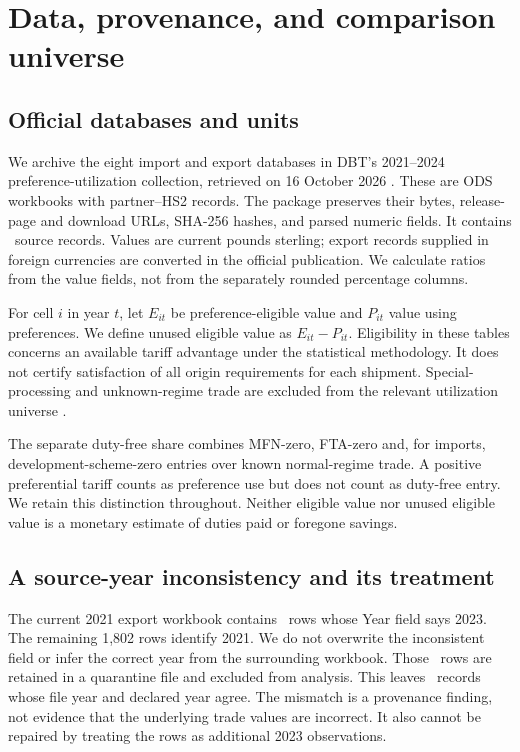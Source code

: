 \documentclass[11pt,a4paper]{article}
\begin{document}
\section{Data, provenance, and comparison universe}
\subsection{Official databases and units}
We archive the eight import and export databases in DBT's 2021--2024 preference-utilization collection, retrieved on 16 October 2026 \citep{dbt2026a}. These are ODS workbooks with partner--HS2 records. The package preserves their bytes, release-page and download URLs, SHA-256 hashes, and parsed numeric fields. It contains \RawRows\ source records. Values are current pounds sterling; export records supplied in foreign currencies are converted in the official publication. We calculate ratios from the value fields, not from the separately rounded percentage columns.

For cell $i$ in year $t$, let $E_{it}$ be preference-eligible value and $P_{it}$ value using preferences. We define unused eligible value as $E_{it}-P_{it}$. Eligibility in these tables concerns an available tariff advantage under the statistical methodology. It does not certify satisfaction of all origin requirements for each shipment. Special-processing and unknown-regime trade are excluded from the relevant utilization universe \citep{dbtannex2026}.

The separate duty-free share combines MFN-zero, FTA-zero and, for imports, development-scheme-zero entries over known normal-regime trade. A positive preferential tariff counts as preference use but does not count as duty-free entry. We retain this distinction throughout. Neither eligible value nor unused eligible value is a monetary estimate of duties paid or foregone savings.



\subsection{A source-year inconsistency and its treatment}
The current 2021 export workbook contains \QuarantineRows\ rows whose Year field says 2023. The remaining 1,802 rows identify 2021. We do not overwrite the inconsistent field or infer the correct year from the surrounding workbook. Those \QuarantineRows\ rows are retained in a quarantine file and excluded from analysis. This leaves \PanelRows\ records whose file year and declared year agree. The mismatch is a provenance finding, not evidence that the underlying trade values are incorrect. It also cannot be repaired by treating the rows as additional 2023 observations.
\end{document}
